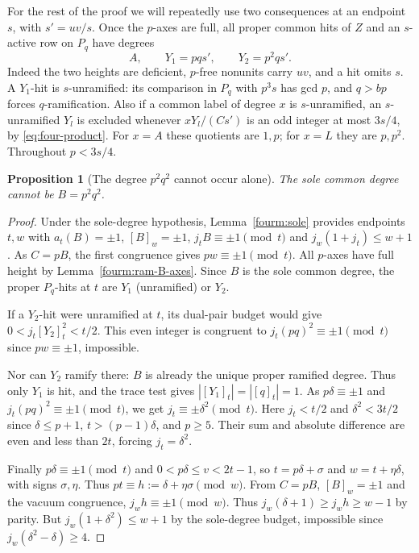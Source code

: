 \documentclass[11pt,a4paper]{article}
\numberwithin{equation}{section}
\newtheorem{proposition}[theorem]{Proposition}
\theoremstyle{remark}
\begin{document}
For the rest of the proof we will repeatedly use two consequences at
an endpoint $s$, with $s'=uv/s$. Once the $p$-axes are full, all proper
common hits of $Z$ and an $s$-active row on $P_q$ have degrees
\[
                 A,\qquad Y_1=pqs',\qquad Y_2=p^2qs'.
\]
Indeed the two heights are deficient, $p$-free nonunits carry $uv$,
and a hit omits $s$. A $Y_1$-hit is $s$-unramified: its comparison
in $P_q$ with $p^3s$ has gcd $p$, and $q>bp$ forces
$q$-ramification. Also if a common label of degree $x$ is
$s$-unramified, an $s$-unramified $Y_l$ is excluded whenever
$xY_l/(Cs')$ is an odd integer at most $3s/4$, by
\eqref{eq:four-product}. For $x=A$ these quotients are $1,p$;
for $x=L$ they are $p,p^2$. Throughout $p<3s/4$.

\begin{proposition}[The degree $p^2q^2$ cannot occur alone]\label{fam:M:12.7}\label{new:sole-B-global}
The sole common degree cannot be $B=p^2q^2$.
\end{proposition}
\begin{proof}
Under the sole-degree hypothesis, Lemma~\ref{fourm:sole}
provides endpoints $t,w$ with $a_t(B)=\pm1$, $[B]_w=\pm1$,
$j_t B\equiv\pm1\pmod t$ and $j_w(1+j_t)\le w+1$.
As $C=pB$, the first congruence gives $pw\equiv\pm1\pmod t$.
All $p$-axes have full height by Lemma~\ref{fourm:ram-B-axes}.
Since $B$ is the sole common degree, the proper $P_q$-hits at $t$
are $Y_1$ (unramified) or $Y_2$.

If a $Y_2$-hit were unramified at $t$, its dual-pair budget would give
$0<j_t[Y_2]_t^2<t/2$. This even integer is congruent to
$j_t(pq)^2\equiv\pm1\pmod t$ since $pw\equiv\pm1$, impossible.

Nor can $Y_2$ ramify there: $B$ is already the unique proper
ramified degree. Thus only $Y_1$ is hit, and the trace test gives
$|[Y_1]_t|=|[q]_t|=1$. As $p\delta\equiv\pm1$ and
$j_t(pq)^2\equiv\pm1\pmod t$, we get $j_t\equiv\pm\delta^2\pmod t$.
Here $j_t<t/2$ and $\delta^2<3t/2$ since
$\delta\le p+1$, $t>(p-1)\delta$, and $p\ge5$. Their sum and
absolute difference are even and less than $2t$, forcing $j_t=\delta^2$.

Finally $p\delta\equiv\pm1\pmod t$ and $0<p\delta\le v<2t-1$,
so $t=p\delta+\sigma$ and $w=t+\eta\delta$, with signs
$\sigma,\eta$. Thus $pt\equiv h:=\delta+\eta\sigma\pmod w$.
From $C=pB$, $[B]_w=\pm1$ and the vacuum congruence,
$j_wh\equiv\pm1\pmod w$. Thus $j_w(\delta+1)\ge j_wh\ge w-1$ by parity. But
$j_w(1+\delta^2)\le w+1$ by the sole-degree budget, impossible since
$j_w(\delta^2-\delta)\ge4$.
\end{proof}
\end{document}

